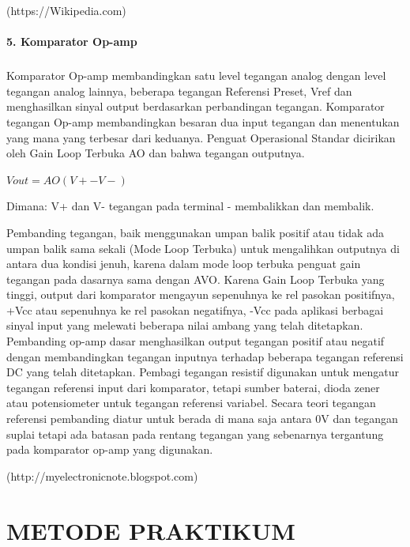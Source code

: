 \documentclass[12pt,a4paper]{article}
\begin{document}
\begin{flushright}
(https://Wikipedia.com) 
\end{flushright}

\paragraph{ }
\textbf{5. Komparator Op-amp}
\subparagraph{ }
	Komparator Op-amp membandingkan satu level tegangan analog dengan level tegangan analog lainnya, beberapa tegangan Referensi Preset, Vref dan menghasilkan sinyal output berdasarkan perbandingan tegangan. Komparator tegangan Op-amp membandingkan besaran dua input tegangan dan menentukan yang mana yang terbesar dari keduanya. Penguat Operasional Standar dicirikan oleh Gain Loop Terbuka AO dan bahwa tegangan outputnya.
	
	\begin{center}
	$ Vout = AO (V+ - V-)$
	\end{center}
	Dimana: V+ dan V- tegangan pada terminal - membalikkan dan membalik.

Pembanding tegangan, baik menggunakan umpan balik positif atau tidak ada umpan balik sama sekali (Mode Loop Terbuka) untuk mengalihkan outputnya di antara dua kondisi jenuh, karena dalam mode loop terbuka penguat gain tegangan pada dasarnya sama dengan AVO. Karena Gain Loop Terbuka yang tinggi, output dari komparator mengayun sepenuhnya ke rel pasokan positifnya, +Vcc atau sepenuhnya ke rel pasokan negatifnya, -Vcc pada aplikasi berbagai sinyal input yang melewati beberapa nilai ambang yang telah ditetapkan. Pembanding op-amp dasar menghasilkan output tegangan positif atau negatif dengan membandingkan tegangan inputnya terhadap beberapa tegangan referensi DC yang telah ditetapkan. Pembagi tegangan resistif digunakan untuk mengatur tegangan referensi input dari komparator, tetapi sumber baterai, dioda zener atau potensiometer untuk tegangan referensi variabel. Secara teori tegangan referensi pembanding diatur untuk berada di mana saja antara 0V dan tegangan suplai tetapi ada batasan pada rentang tegangan yang sebenarnya tergantung pada komparator op-amp yang digunakan.
	
\begin{flushright}
(http://myelectronicnote.blogspot.com) 
\end{flushright}


\newpage
\section{METODE PRAKTIKUM}
\end{document}
